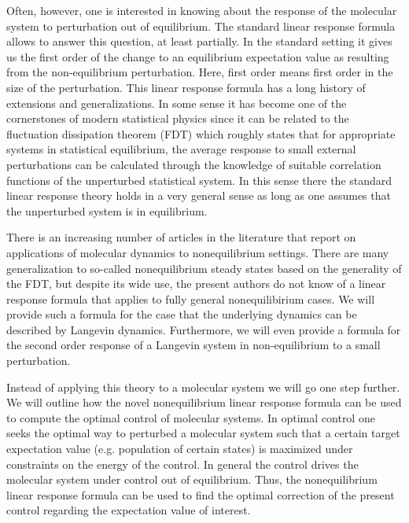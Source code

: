 \documentclass[aip,jcp,a4paper,reprint,onecolumn]{revtex4-1}
\begin{document}
Often, however, one is interested in knowing about the response of the molecular system to perturbation out of equilibrium. The standard linear response formula allows to answer this question, at least partially. In the standard setting it gives us the first order of the change to an equilibrium expectation value as resulting from the non-equilibrium perturbation. Here, first order means first order in the size of the perturbation. This linear response formula has a long history of extensions and generalizations. In some sense it has become one of the cornerstones of modern statistical physics since it can be related to the fluctuation dissipation theorem (FDT) which roughly states that for appropriate systems in statistical equilibrium, the average response to small external perturbations can be calculated through the knowledge of suitable correlation functions of the unperturbed statistical system. In this sense there the standard linear response theory holds in a  very general sense \cite{Majda} as long as one assumes that the unperturbed system is in equilibrium.

There is an increasing number of articles in the literature that report on applications of molecular dynamics to nonequilibrium settings. There are many generalization to so-called nonequilibrium steady states based on the generality of the FDT, but despite its wide use, the present authors do not know of a linear response formula that applies to fully general nonequilibirium cases. We will provide such a formula for the case that the underlying dynamics can be described by Langevin dynamics. Furthermore, we will even provide a formula for the second order response of a Langevin system in non-equilibrium to a small perturbation.

Instead of applying this theory to a molecular system we will go one step further. We will outline how the novel nonequilibrium linear response formula can be used to compute the optimal control of molecular systems. In optimal control one seeks the optimal way to perturbed a molecular system such that a certain target expectation value (e.g. population of certain states) is maximized under constraints on the energy of the control. In general the control drives the molecular system under control out of equilibrium. Thus, the nonequilibrium linear response formula can be used to find the optimal correction of the present control regarding the expectation value of interest. 
\end{document}
